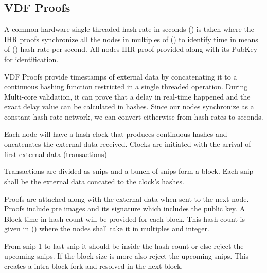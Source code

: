 \documentclass[../Bitcoin Blink.tex]{subfiles}
\begin{document}
\normalsize
\subsection{VDF Proofs}

A common hardware single threaded hash-rate in seconds () is taken where the IHR proofs synchronize all the nodes in multiples of () to identify time in means of () hash-rate per second. All nodes IHR proof provided along with its PubKey for identification.

VDF Proofs provide timestamps of external data by concatenating it to a continuous hashing function restricted in a single threaded operation. During Multi-core validation, it can prove that a delay in real-time happened and the exact delay value can be calculated in hashes. Since our nodes synchronize as a constant hash-rate network, we can convert eitherwise from hash-rates to seconds.

Each node will have a hash-clock that produces continuous hashes and oncatenates the external data received. Clocks are initiated with the arrival of first external data (transactions)

Transactions are divided as snips and a bunch of snips form a block. Each snip shall be the external data concated to the clock's hashes.

Proofs are attached along with the external data when sent to the next node. Proofs include pre images and its signature which includes the public key. A Block time in hash-count will be provided for each block. This hash-count is given in () where the nodes shall take it in multiples and integer. 

From snip 1 to last snip it should be inside the hash-count or else reject the upcoming snips. If the block size is more also reject the upcoming snips. This creates a intra-block fork and resolved in the next block. 
\end{document}
